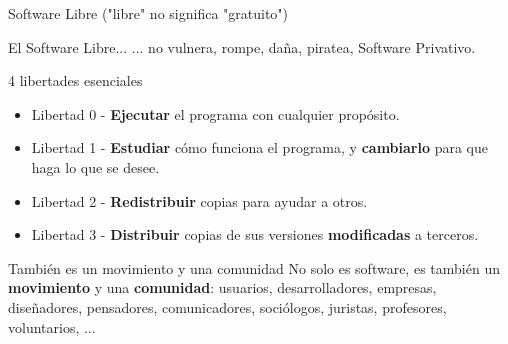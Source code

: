 \documentclass[spanish]{beamer}
\begin{document}
\begin{frame}{Software Libre ("libre" no significa "gratuito")}
    \begin{alertblock}{El Software Libre...}        
        ... no vulnera, rompe, daña, piratea, Software Privativo.        
    \end{alertblock}
    \begin{block}{4 libertades esenciales}
        \begin{itemize}
            \item Libertad 0 - \textbf{Ejecutar} el programa con cualquier propósito.
            \item Libertad 1 - \textbf{Estudiar} cómo funciona el programa, y \textbf{cambiarlo} para que haga lo que se desee.
            \item Libertad 2 - \textbf{Redistribuir} copias para ayudar a otros.
            \item Libertad 3 - \textbf{Distribuir} copias de sus versiones \textbf{modificadas} a terceros.
        \end{itemize}
        
    \end{block}

    \begin{alertblock}{También es un movimiento y una comunidad}        
        No solo es software, es también un \textbf{movimiento} y una \textbf{comunidad}: usuarios, desarrolladores, empresas, diseñadores, pensadores, comunicadores, sociólogos, juristas, profesores, voluntarios, ...
    \end{alertblock}
\end{frame}
\end{document}
